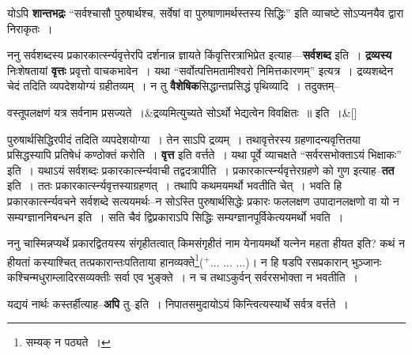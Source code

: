 \documentclass[article,12pt,a4paper]{memoir}
\newcommand{\add}[1]{($^{+}$#1)}
\begin{document}
	  \pstart योऽपि \textbf{शान्तभद्रः} “सर्वश्चासौ पुरुषार्थश्च, सर्वेषां वा पुरुषाणामर्थस्तस्य सिद्धिः” इति व्याचष्टे सोऽप्यनयैव द्वारा निराकृतः ।
	\pend
      

	  \pstart ननु सर्वशब्दस्य प्रकारकार्त्स्न्यवृत्तेरपि दर्शनान्न ज्ञायते किंवृत्तिरत्राभिप्रेत इत्याह—\textbf{सर्वशब्द} इति । \textbf{द्रव्यस्य} निःशेषतायां \textbf{वृत्तः} प्रवृत्तो वाचकभावेन । यथा “सर्वोत्पत्तिमतामीश्वरो निमित्तकारणम्” इत्य\leavevmode{}त्र । द्रव्यशब्देन चेदं तदिति व्यपदेशयोग्यं ग्रहीतव्यम् । न तु \textbf{वैशेषिक}सिद्धान्तप्रसिद्धं पृथिव्यादि । तदुक्तम्--
	\pend
      
	  \bigskip
	  \begingroup
	
	    
	    \stanza[\smallbreak]
	वस्तूपलक्षणं यत्र सर्वनाम प्रसज्यते ।&द्रव्यमित्युच्यते सोऽर्थो भेद्यत्वेन विवक्षितः ॥ इति ।\&[\smallbreak]


	
	  \endgroup
	

	  \pstart पुरुषार्थसिद्धिरपीदं तदिति व्यपदेशयोग्या । तेन साऽपि द्रव्यम् । तथावृत्तेरस्य ग्रहणादन्यवृत्तितया प्रसिद्धस्यापि प्रतिषेधं कण्ठोक्तं करोति । \textbf{वृत्त} इति वर्त्तते । यथा पूर्वे व्याचक्षते “सर्वरसभोक्ताऽयं भिक्षाकः” इति । यथाऽयं सर्वशब्दः प्रकारकार्त्स्न्यवाची तद्वदत्रापीति । प्रकारकार्त्स्न्यवृत्तेरग्रहणे को गुण इत्याह--\textbf{तत} इति । ततः प्रकारकार्त्स्न्यवृत्तस्याग्रहणत् । तथापि कथमयमर्थो भवतीति चेत् । भवति हि प्रकारकार्त्स्न्यवचने सर्वशब्दे सत्ययमर्थः--न सोऽस्ति पुरुषार्थसिद्धेः प्रकारः फललक्षण उपादानलक्षणो वा यो न सम्यग्ज्ञाननिबन्धन इति । सति चैवं द्विप्रकाराऽपि सिद्धिः सम्यग्ज्ञानपूर्विकेत्ययमर्थो भवति ।
	\pend
      

	  \pstart ननु चास्मिन्नप्यर्थे प्रकारद्वितयस्य संगृहीतत्वात् किमसंगृहीतं नाम येनायमर्थो यत्नेन महता हीयत इति? कथं न हीयतां कस्याश्चित् तत्प्रकारान्तःपतिताया हानव्यक्ते\footnote{सम्यक् न पठ्यते ।}\add{... ... ...}। न हि षडपि रसप्रकारान् भुञ्जानः कश्चिन्मधुराम्लादिरसव्यक्तीः सर्वा एव भुङ्क्ते । न च तथाऽकुर्वन् सर्वरसभोक्ता न भवतीति ।
	\pend
      

	  \pstart यद्ययं नार्थः कस्तर्हीत्याह--\textbf{अपि} तु--इति । निपातसमुदायोऽयं किन्त्वित्यस्यार्थे सर्वत्र वर्त्तते ।
	\pend
      
\end{document}
